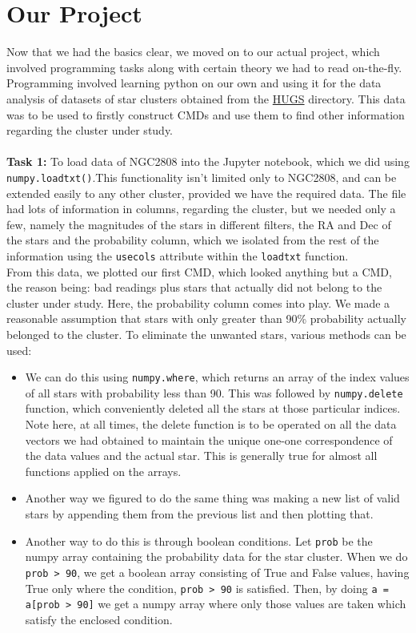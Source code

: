 \documentclass{article}
\begin{document}
\section{Our Project}
\large Now that we had the basics clear, we moved on to our actual project, which involved programming tasks along with certain theory we had to read on-the-fly. Programming involved learning python on our own and using it for the data analysis of datasets of star clusters obtained from the \href{https://archive.stsci.edu/prepds/hugs/}{HUGS} \parencite{piotto2015hubble} \parencite{nardiello2018hubble} directory. This data was to be used to firstly construct CMDs and use them to find other information regarding the cluster under study. \\
\\
\textbf{Task 1:} To load data of NGC2808 into the Jupyter notebook, which we did using \texttt{numpy.loadtxt()}.This functionality isn't limited only to NGC2808, and can be extended easily to any other cluster, provided we have the required data.  The file had lots of information in columns, regarding the cluster, but we needed only a few, namely the magnitudes of the stars in different filters, the RA and Dec of the stars and the probability column, which we isolated from the rest of the information using the \texttt{usecols} attribute within the \texttt{loadtxt} function. \\
From this data, we plotted our first CMD, which looked anything but a CMD, the reason being: bad readings plus stars that actually did not belong to the cluster under study. Here, the probability column comes into play. We made a reasonable assumption that stars with only greater than 90\% probability actually belonged to the cluster. To eliminate the unwanted stars, various methods can be used:
\begin{itemize}
    \item 
         We can do this using \texttt{numpy.where}, which returns an array of the index values of all stars with probability less than 90. This was followed by \texttt{numpy.delete} function, which conveniently deleted all the stars at those particular indices. \newline
         Note here, at all times, the delete function is to be operated on all the data vectors we had obtained to maintain the unique one-one correspondence of the data values and the actual star. This is generally true for almost all functions applied on the arrays.
     \item 
        Another way we figured to do the same thing was making a new list of valid stars by appending them from the previous list and then plotting that.
    \item     
        Another way to do this is through boolean conditions.\newline
        Let \texttt{prob} be the numpy array containing the probability data for the star cluster. When we do \texttt{prob > 90}, we get a boolean array consisting of True and False values, having True only where the condition, \texttt{prob > 90} is satisfied.\newline
        Then, by doing \texttt{a = a[prob > 90]} we get a numpy array where only those values are taken which satisfy the enclosed condition.
    \end{itemize}
\end{document}
